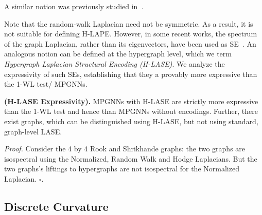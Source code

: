A similar notion was previously studied in~\citep{banerjee2021spectrum}. 

Note that the random-walk Laplacian need not be symmetric. As a result, it is not suitable for defining H-LAPE. However, in some recent works, the spectrum of the graph Laplacian, rather than its eigenvectors, have been used as SE~\citep{kreuzer2021rethinking}. An analogous notion can be defined at the hypergraph level, which we term \emph{Hypergraph Laplacian Structural Encoding (H-LASE)}. We analyze the expressivity of such SEs, establishing that they a provably more expressive than the 1-WL test/ MPGNNs.


\begin{theorem}\label{thm:lape_exp} \textbf{(H-LASE Expressivity).} MPGNNs with H-LASE are strictly more expressive than the 1-WL test and hence than MPGNNs without encodings. Further, there exist graphs, which can be distinguished using H-LASE, but not using standard, graph-level LASE. 
\end{theorem}

\textit{Proof.} Consider the 4 by 4 Rook and Shrikhande graphs: the two graphs are isospectral using the Normalized, Random Walk and Hodge Laplacians. But the two graphs's liftings to hypergraphs are not isospectral for the Normalized Laplacian. $\square$. 

\subsection{Discrete Curvature}\label{apx:curvature}
